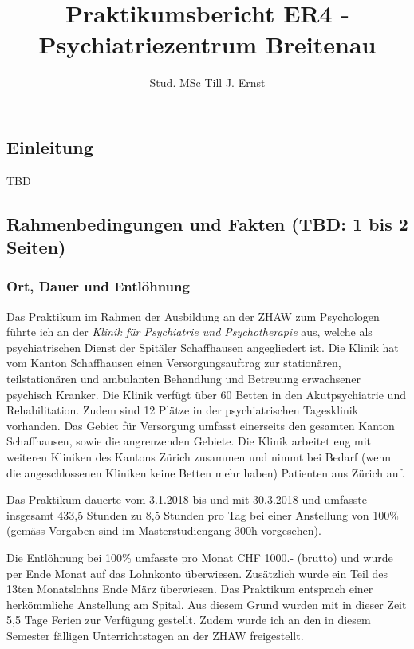\documentclass[jou,apacite]{apa6}
\title{Praktikumsbericht ER4 - Psychiatriezentrum Breitenau}
\author{Stud. MSc Till J. Ernst}
\affiliation{Applied Psychology ZHAW}
\begin{document}
\maketitle    
   
\subsection{Einleitung} \label{sec:Einleitung}
TBD

\subsection{Rahmenbedingungen und Fakten (TBD: 1 bis 2 Seiten)} \label{sec:Rahmenbedingungen}

\subsubsection{Ort, Dauer und Entlöhnung} 
Das Praktikum im Rahmen der Ausbildung an der ZHAW zum Psychologen führte ich an der \textit{Klinik für Psychiatrie und Psychotherapie} aus, welche als psychiatrischen Dienst der Spitäler Schaffhausen angegliedert ist. Die Klinik hat vom Kanton Schaffhausen einen Versorgungsauftrag zur stationären, teilstationären und ambulanten Behandlung und Betreuung erwachsener psychisch Kranker. Die Klinik verfügt über 60 Betten in den Akutpsychiatrie und Rehabilitation. Zudem sind 12 Plätze in der psychiatrischen Tagesklinik vorhanden. Das Gebiet für Versorgung umfasst einerseits den gesamten Kanton Schaffhausen, sowie die angrenzenden Gebiete. Die Klinik arbeitet eng mit weiteren Kliniken des Kantons Zürich zusammen und nimmt bei Bedarf (wenn die angeschlossenen Kliniken keine Betten mehr haben) Patienten aus Zürich auf.

Das Praktikum dauerte vom 3.1.2018 bis und mit 30.3.2018 und umfasste insgesamt 433,5 Stunden zu 8,5 Stunden pro Tag bei einer Anstellung von 100\% (gemäss Vorgaben sind im Masterstudiengang 300h vorgesehen). 

Die Entlöhnung bei 100\% umfasste pro Monat CHF 1000.- (brutto) und wurde per Ende Monat auf das Lohnkonto überwiesen. Zusätzlich wurde ein Teil des 13ten Monatslohns Ende März überwiesen. Das Praktikum entsprach einer herkömmliche Anstellung am Spital. Aus diesem Grund wurden mit in dieser Zeit 5,5 Tage Ferien zur Verfügung gestellt. Zudem wurde ich an den in diesem Semester fälligen Unterrichtstagen an der ZHAW freigestellt. 
\end{document}
